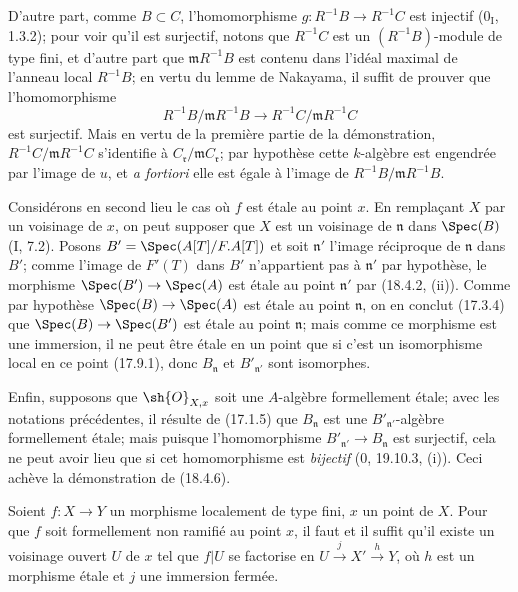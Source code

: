 D'autre part, comme $B\subset C$, l'homomorphisme $g:R^{-1}B\to R^{-1}C$ est injectif ($0_{\mathrm I}$, 1.3.2); pour voir qu'il est surjectif, notons que $R^{-1}C$ est un $(R^{-1}B)$-module de type fini, et d'autre part que $\mathfrak mR^{-1}B$ est contenu dans l'idéal maximal de l'anneau local $R^{-1}B$; en vertu du lemme de Nakayama, il suffit de prouver que l'homomorphisme
\[
  R^{-1}B/\mathfrak mR^{-1}B\longrightarrow R^{-1}C/\mathfrak mR^{-1}C
\]
est surjectif. Mais en vertu de la première partie de la démonstration, $R^{-1}C/\mathfrak mR^{-1}C$ s'identifie à $C_{\mathfrak r}/\mathfrak mC_{\mathfrak r}$; par hypothèse cette $k$-algèbre est engendrée par l'image de $u$, et \emph{a fortiori} elle est égale à l'image de $R^{-1}B/\mathfrak mR^{-1}B$.

Considérons en second lieu le cas où $f$ est étale au point $x$. En remplaçant $X$ par un voisinage de $x$, on peut supposer que $X$ est un voisinage de $\mathfrak n$ dans $\Spec(B)$ (I, 7.2). Posons $B'=\Spec(A[T]/F.A[T])$ et soit $\mathfrak n'$ l'image réciproque de $\mathfrak n$ dans $B'$; comme l'image de $F'(T)$ dans $B'$ n'appartient pas à $\mathfrak n'$ par hypothèse, le morphisme $\Spec(B')\to\Spec(A)$ est étale au point $\mathfrak n'$ par (18.4.2, (ii)). Comme par hypothèse $\Spec(B)\to\Spec(A)$ est étale au point $\mathfrak n$, on en conclut (17.3.4) que $\Spec(B)\to\Spec(B')$ est étale au point $\mathfrak n$; mais comme ce morphisme est une immersion, il ne peut être étale en un point que si c'est un isomorphisme local en ce point (17.9.1), donc $B_{\mathfrak n}$ et $B'_{\mathfrak n'}$ sont isomorphes.

Enfin, supposons que $\sh{O}_{X,x}$ soit une $A$-algèbre formellement étale; avec les notations précédentes, il résulte de (17.1.5) que $B_{\mathfrak n}$ est une $B'_{\mathfrak n'}$-algèbre formellement étale; mais puisque l'homomorphisme $B'_{\mathfrak n'}\to B_{\mathfrak n}$ est surjectif, cela ne peut avoir lieu que si cet homomorphisme est \emph{bijectif} (0, 19.10.3, (i)). Ceci achève la démonstration de (18.4.6).

\begin{corollary}[18.4.7]
\label{IV.18.4.7}
Soient $f:X\to Y$ un morphisme localement de type fini, $x$ un point de $X$. Pour que $f$ soit formellement non ramifié au point $x$, il faut et il suffit qu'il existe un voisinage ouvert $U$ de $x$ tel que $f|U$ se factorise en $U\xrightarrow{j}X'\xrightarrow{h}Y$, où $h$ est un morphisme étale et $j$ une immersion fermée.
\end{corollary}

